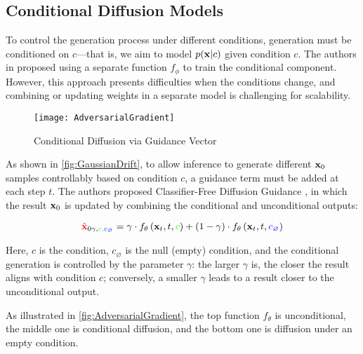 \subsection{Conditional Diffusion Models}
\label{subsec:DiffusionCondition}

To control the generation process under different conditions, generation must be conditioned on $c$—that is, we aim to model $p(\mathbf{x} | c)$ given condition $c$. The authors in \cite{dhariwal2021diffusion} proposed using a separate function $f_{\phi}$ to train the conditional component. However, this approach presents difficulties when the conditions change, and combining or updating weights in a separate model is challenging for scalability.

\begin{figure}[H]
	\captionsetup{skip=20pt}
	\texttt{[image: AdversarialGradient]}
	\caption{Conditional Diffusion via Guidance Vector}
	\label{fig:AdversarialGradient}
\end{figure}

As shown in \autoref{fig:GaussianDrift}, to allow inference to generate different $\mathbf{x}_0$ samples controllably based on condition $c$, a guidance term must be added at each step $t$. The authors proposed Classifier-Free Diffusion Guidance \cite{ho2022classifier}, in which the result $\mathbf{x}_0$ is updated by combining the conditional and unconditional outputs:

\begin{equation}
{\color{red}{\hat{\mathbf{x}}}}_{0 \gamma, \color{green}{c}, \color{blue}{c_{\varnothing}}}=\gamma \cdot f_{\theta} \left(\mathbf{x}_{t}, t, {\color{green}{c}} \right)+(1-\gamma) \cdot f_{\theta} \left(\mathbf{x}_{t}, t, {\color{blue}{c_{\varnothing}}} \right)
\end{equation}

Here, $c$ is the condition, $c_{\varnothing}$ is the null (empty) condition, and the conditional generation is controlled by the parameter $\gamma$: the larger $\gamma$ is, the closer the result aligns with condition $c$; conversely, a smaller $\gamma$ leads to a result closer to the unconditional output.

As illustrated in \autoref{fig:AdversarialGradient}, the top function $f_{\theta}$ is unconditional, the middle one is conditional diffusion, and the bottom one is diffusion under an empty condition.
